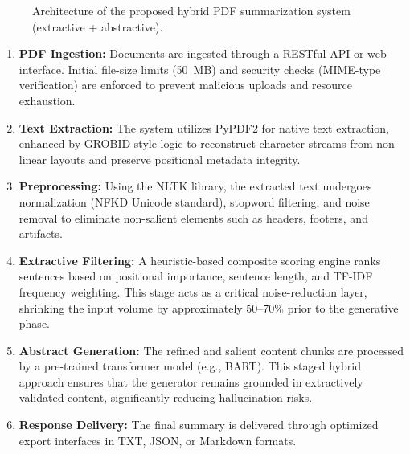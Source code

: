 \documentclass[conference]{IEEEtran}
\begin{document}
\begin{figure}[!htbp]
    \centering
    \caption{Architecture of the proposed hybrid PDF summarization system (extractive + abstractive).}
    \label{fig:pipeline}
\end{figure}

\begin{enumerate}
    \item \textbf{PDF Ingestion:} Documents are ingested through a RESTful API or web interface\cite{13}. Initial file-size limits (50~MB) and security checks (MIME-type verification) are enforced to prevent malicious uploads and resource exhaustion.
    
    \item \textbf{Text Extraction:} The system utilizes PyPDF2 for native text extraction\cite{3, 4}, enhanced by GROBID-style logic\cite{10, 23 , 17} to reconstruct character streams from non-linear layouts and preserve positional metadata integrity.
    
    \item \textbf{Preprocessing:} Using the NLTK library, the extracted text undergoes normalization (NFKD Unicode standard), stopword filtering, and noise removal to eliminate non-salient elements such as headers, footers, and artifacts.
    
    \item \textbf{Extractive Filtering:} A heuristic-based composite scoring engine ranks sentences based on positional importance, sentence length, and TF-IDF frequency weighting\cite{8, 15}. This stage acts as a critical noise-reduction layer, shrinking the input volume by approximately 50--70\% prior to the generative phase.
    
    \item \textbf{Abstract Generation:} The refined and salient content chunks are processed by a pre-trained transformer model (e.g., BART)\cite{2}. This staged hybrid approach ensures that the generator remains grounded in extractively validated content\cite{14}, significantly reducing hallucination risks.
    
    \item \textbf{Response Delivery:} The final summary is delivered through optimized export interfaces in TXT, JSON, or Markdown formats.
\end{enumerate}
\end{document}

